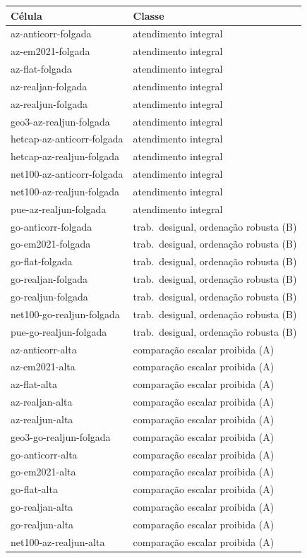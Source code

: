 \begin{tabular}{ll}
\toprule
Célula & Classe \\
\midrule
az-anticorr-folgada & atendimento integral \\
az-em2021-folgada & atendimento integral \\
az-flat-folgada & atendimento integral \\
az-realjan-folgada & atendimento integral \\
az-realjun-folgada & atendimento integral \\
geo3-az-realjun-folgada & atendimento integral \\
hetcap-az-anticorr-folgada & atendimento integral \\
hetcap-az-realjun-folgada & atendimento integral \\
net100-az-anticorr-folgada & atendimento integral \\
net100-az-realjun-folgada & atendimento integral \\
pue-az-realjun-folgada & atendimento integral \\
go-anticorr-folgada & trab.\ desigual, ordenação robusta (B) \\
go-em2021-folgada & trab.\ desigual, ordenação robusta (B) \\
go-flat-folgada & trab.\ desigual, ordenação robusta (B) \\
go-realjan-folgada & trab.\ desigual, ordenação robusta (B) \\
go-realjun-folgada & trab.\ desigual, ordenação robusta (B) \\
net100-go-realjun-folgada & trab.\ desigual, ordenação robusta (B) \\
pue-go-realjun-folgada & trab.\ desigual, ordenação robusta (B) \\
az-anticorr-alta & comparação escalar proibida (A) \\
az-em2021-alta & comparação escalar proibida (A) \\
az-flat-alta & comparação escalar proibida (A) \\
az-realjan-alta & comparação escalar proibida (A) \\
az-realjun-alta & comparação escalar proibida (A) \\
geo3-go-realjun-folgada & comparação escalar proibida (A) \\
go-anticorr-alta & comparação escalar proibida (A) \\
go-em2021-alta & comparação escalar proibida (A) \\
go-flat-alta & comparação escalar proibida (A) \\
go-realjan-alta & comparação escalar proibida (A) \\
go-realjun-alta & comparação escalar proibida (A) \\
net100-az-realjun-alta & comparação escalar proibida (A) \\
\bottomrule
\end{tabular}

